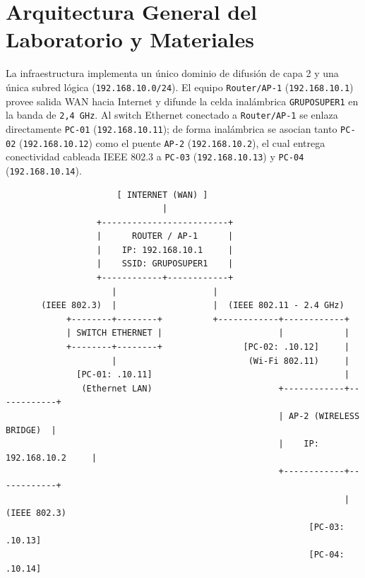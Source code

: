 \documentclass[11pt, a4paper]{article}
\begin{document}
\section{Arquitectura General del Laboratorio y Materiales}

La infraestructura implementa un único dominio de difusión de capa 2 y una única subred lógica (\texttt{192.168.10.0/24}). El equipo \texttt{Router/AP-1} (\texttt{192.168.10.1}) provee salida WAN hacia Internet y difunde la celda inalámbrica \texttt{GRUPOSUPER1} en la banda de \texttt{2,4 GHz}. Al switch Ethernet conectado a \texttt{Router/AP-1} se enlaza directamente \texttt{PC-01} (\texttt{192.168.10.11}); de forma inalámbrica se asocian tanto \texttt{PC-02} (\texttt{192.168.10.12}) como el puente \texttt{AP-2} (\texttt{192.168.10.2}), el cual entrega conectividad cableada IEEE 802.3 a \texttt{PC-03} (\texttt{192.168.10.13}) y \texttt{PC-04} (\texttt{192.168.10.14}).

{\footnotesize
\begin{verbatim}
                      [ INTERNET (WAN) ]
                               |
                  +-------------------------+
                  |      ROUTER / AP-1      |
                  |    IP: 192.168.10.1     |
                  |    SSID: GRUPOSUPER1    |
                  +------------+------------+
                     |                   |
       (IEEE 802.3)  |                   |  (IEEE 802.11 - 2.4 GHz)
            +--------+--------+          +------------+------------+
            | SWITCH ETHERNET |                       |            |
            +--------+--------+                [PC-02: .10.12]     |
                     |                          (Wi-Fi 802.11)     |
              [PC-01: .10.11]                                      |
               (Ethernet LAN)                         +------------+------------+
                                                      | AP-2 (WIRELESS BRIDGE)  |
                                                      |    IP: 192.168.10.2     |
                                                      +------------+------------+
                                                                   | (IEEE 802.3)
                                                            [PC-03: .10.13]
                                                            [PC-04: .10.14]
\end{verbatim}
}
\end{document}
